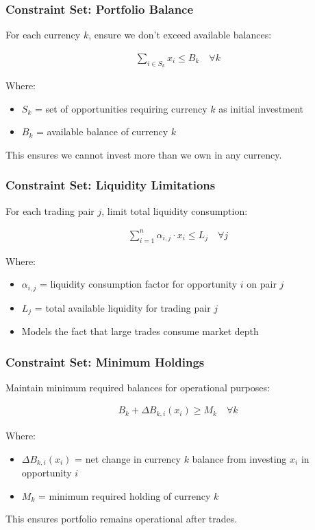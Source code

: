 \documentclass{beamer}
\begin{document}
\begin{frame}
\frametitle{Constraint Set: Portfolio Balance}
For each currency $k$, ensure we don't exceed available balances:

\begin{align}
\sum_{i \in S_k} x_i \leq B_k \quad \forall k
\end{align}

Where:
\begin{itemize}
    \item $S_k$ = set of opportunities requiring currency $k$ as initial investment
    \item $B_k$ = available balance of currency $k$
\end{itemize}

\vspace{0.5cm}

This ensures we cannot invest more than we own in any currency.
\end{frame}

\begin{frame}
\frametitle{Constraint Set: Liquidity Limitations}
For each trading pair $j$, limit total liquidity consumption:

\begin{align}
\sum_{i=1}^{n} \alpha_{i,j} \cdot x_i \leq L_j \quad \forall j
\end{align}

Where:
\begin{itemize}
    \item $\alpha_{i,j}$ = liquidity consumption factor for opportunity $i$ on pair $j$
    \item $L_j$ = total available liquidity for trading pair $j$
    \item Models the fact that large trades consume market depth
\end{itemize}
\end{frame}

\begin{frame}
\frametitle{Constraint Set: Minimum Holdings}
Maintain minimum required balances for operational purposes:

\begin{align}
B_k + \Delta B_{k,i}(x_i) \geq M_k \quad \forall k
\end{align}

Where:
\begin{itemize}
    \item $\Delta B_{k,i}(x_i)$ = net change in currency $k$ balance from investing $x_i$ in opportunity $i$
    \item $M_k$ = minimum required holding of currency $k$
\end{itemize}

\vspace{0.5cm}

This ensures portfolio remains operational after trades.
\end{frame}
\end{document}
